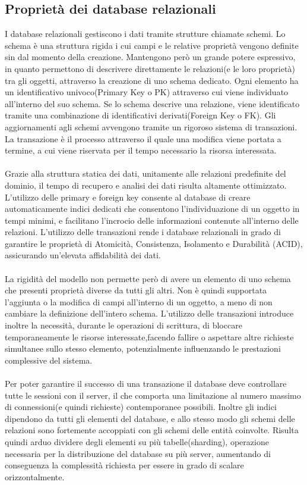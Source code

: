 \subsection{Proprietà dei database relazionali}

I database relazionali gestiscono i dati tramite strutture chiamate schemi.
Lo schema è una struttura rigida i cui campi e le relative proprietà
vengono definite sin dal momento della creazione.
Mantengono però un grande potere espressivo,
in quanto permettono di descrivere direttamente le relazioni(e le loro proprietà) tra gli oggetti,
attraverso la creazione di uno schema dedicato.
Ogni elemento ha un identificativo univoco(Primary Key o PK)
attraverso cui viene individuato all'interno del suo schema.
Se lo schema descrive una relazione, viene identificato tramite
una combinazione di identificativi derivati(Foreign Key o FK).
Gli aggiornamenti agli schemi avvengono tramite un rigoroso sistema di transazioni.
La transazione è il processo attraverso il quale una modifica viene portata a termine,
a cui viene riservata per il tempo necessario la risorsa interessata.\\
\\
Grazie alla struttura statica dei dati, unitamente alle relazioni predefinite del dominio,
il tempo di recupero e analisi dei dati risulta altamente ottimizzato.
L'utilizzo delle primary e foreign key consente al database di creare automaticamente indici
dedicati che consentono l'individuazione di un oggetto in tempi minimi,
e facilitano l'incrocio delle informazioni contenute all'interno delle relazioni.
L'utilizzo delle transazioni rende i database relazionali in grado di garantire
le proprietà di Atomicità, Consistenza, Isolamento e Durabilità (ACID),
assicurando un'elevata affidabilità dei dati.\\
\\
La rigidità del modello non permette però di avere un elemento
di uno schema che presenti proprietà diverse da tutti gli altri.
Non è quindi supportata l'aggiunta o la modifica di campi all'interno di un oggetto,
a meno di non cambiare la definizione dell'intero schema.
L'utilizzo delle transazioni introduce inoltre la necessità, durante le operazioni di scrittura,
di bloccare temporaneamente le risorse interessate,facendo fallire o aspettare altre richieste simultanee sullo stesso elemento,
potenzialmente influenzando le prestazioni complessive del sistema.\\
\\
Per poter garantire il successo di una transazione
il database deve controllare tutte le sessioni con il server,
il che comporta una limitazione al numero massimo di connessioni(e quindi richieste) contemporanee possibili.
Inoltre gli indici dipendono da tutti gli elementi del database,
e allo stesso modo gli schemi delle relazioni sono
fortemente accoppiati con gli schemi delle entità coinvolte.
Risulta quindi arduo dividere degli elementi su più tabelle(sharding),
operazione necessaria per la distribuzione del database su più server,
aumentando di conseguenza la complessità richiesta per essere in grado di scalare orizzontalmente.\\

